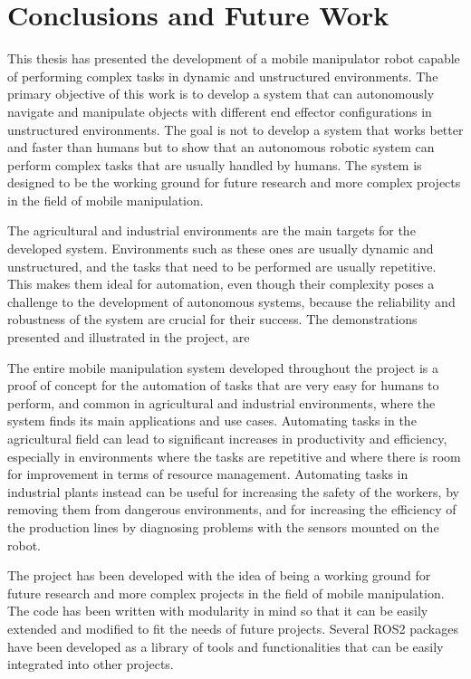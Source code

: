 \chapter{Conclusions and Future Work}

This thesis has presented the development of a mobile manipulator robot capable of performing complex tasks in 
dynamic and unstructured environments. The primary objective of this work is to develop a system that can
autonomously navigate and manipulate objects with different end effector configurations in unstructured environments.
The goal is not to develop a system that works better and faster than humans but to show that an autonomous robotic
system can perform complex tasks that are usually handled by humans. The system is designed to be the working
ground for future research and more complex projects in the field of mobile manipulation.

The agricultural and industrial environments are the main targets for the developed system. Environments such as these
ones are usually dynamic and unstructured, and the tasks that need to be performed are usually repetitive.
This makes them ideal for automation, even though their complexity poses a challenge to the development of autonomous
systems, because the reliability and robustness of the system are crucial for their success.
The demonstrations presented and illustrated in the project, are 

The entire mobile manipulation system developed throughout the project is a proof of concept for the automation of
tasks that are very easy for humans to perform, and common in agricultural and industrial environments,
where the system finds its main applications and use cases. Automating tasks in the agricultural field can lead to significant
increases in productivity and efficiency, especially in environments where the tasks are repetitive and where
there is room for improvement in terms of resource management. Automating tasks in industrial plants instead
can be useful for increasing the safety of the workers, by removing them from dangerous environments, and for
increasing the efficiency of the production lines by diagnosing problems with the sensors mounted on the robot.

The project has been developed with the idea of being a working ground for future research and more complex projects
in the field of mobile manipulation. The code has been written with modularity in mind so that it can be easily
extended and modified to fit the needs of future projects. Several ROS2 packages have been developed as 
a library of tools and functionalities that can be easily integrated into other projects. 

